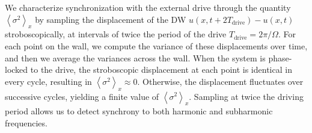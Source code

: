\documentclass[prb,aps,twocolumn,superscriptaddress,floatfix]{revtex4-1}
\newcommand{\luzcom}[1]{{\color{green!50!black}#1}}
\begin{document}
\luzcom{
We characterize synchronization with the external drive through the quantity $\left\langle \sigma^2\right\rangle_x$ by sampling the displacement of the DW $u(x,t+2T_\text{drive})-u(x,t)$ stroboscopically, at intervals of twice the period of the drive $T_\text{drive}=2\pi/\Omega$. For each point on the wall, we compute the variance of these displacements over time, and then we average the variances across the wall. When the system is phase-locked to the drive, the stroboscopic displacement at each point is identical in every cycle, resulting in $\left\langle\sigma^2\right\rangle_x\approx 0$. Otherwise, the displacement fluctuates over successive cycles, yielding a finite value of $\left\langle\sigma^2\right\rangle_x$. Sampling at twice the driving period allows us to detect synchrony to both harmonic and subharmonic frequencies. 
}
%
\end{document}
